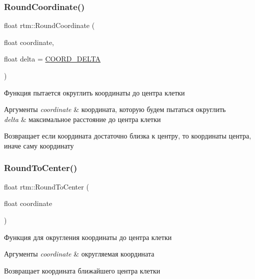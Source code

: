 \subsubsection{\texorpdfstring{Round\+Coordinate()}{RoundCoordinate()}}
{\footnotesize\ttfamily float rtm\+::\+Round\+Coordinate (\begin{DoxyParamCaption}\item[{float}]{coordinate,  }\item[{float}]{delta = {\ttfamily \hyperlink{namespacertm_a9ae158a8873bdf59aa9872cdada6c657}{C\+O\+O\+R\+D\+\_\+\+D\+E\+L\+TA}} }\end{DoxyParamCaption})}



Функция пытается округлить координаты до центра клетки 


\begin{DoxyParams}{Аргументы}
{\em coordinate} & координата, которую будем пытаться округлить \\
\hline
{\em delta} & максимальное расстояние до центра клетки \\
\hline
\end{DoxyParams}
\begin{DoxyReturn}{Возвращает}
если координата достаточно близка к центру, то координаты центра, иначе саму координату 
\end{DoxyReturn}
\mbox{\label{namespacertm_aa2d382c50aa6366b09deaa529d1b3199}} 
\subsubsection{\texorpdfstring{Round\+To\+Center()}{RoundToCenter()}}
{\footnotesize\ttfamily float rtm\+::\+Round\+To\+Center (\begin{DoxyParamCaption}\item[{float}]{coordinate }\end{DoxyParamCaption})}



Функция для округления координаты до центра клетки 


\begin{DoxyParams}{Аргументы}
{\em coordinate} & округляемая координата \\
\hline
\end{DoxyParams}
\begin{DoxyReturn}{Возвращает}
координата ближайшего центра клетки 
\end{DoxyReturn}
\mbox{\label{namespacertm_a030416c27fb4a5896aad3d102083897f}} 
